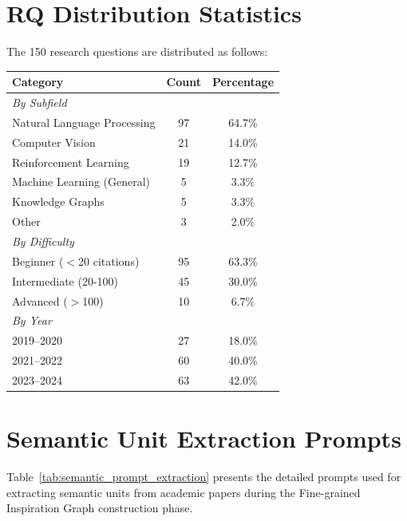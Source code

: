 \documentclass[runningheads]{llncs}
\begin{document}
\section{RQ Distribution Statistics}
\label{app:rq_distribution}

The 150 research questions are distributed as follows:

\begin{table}[h]
\centering
\small
\begin{tabular}{lcc}
\toprule
\textbf{Category} & \textbf{Count} & \textbf{Percentage} \\
\midrule
\multicolumn{3}{l}{\textit{By Subfield}} \\
Natural Language Processing & 97 & 64.7\% \\
Computer Vision & 21 & 14.0\% \\
Reinforcement Learning & 19 & 12.7\% \\
Machine Learning (General) & 5 & 3.3\% \\
Knowledge Graphs & 5 & 3.3\% \\
Other & 3 & 2.0\% \\
\midrule
\multicolumn{3}{l}{\textit{By Difficulty}} \\
Beginner ($<$20 citations) & 95 & 63.3\% \\
Intermediate (20-100) & 45 & 30.0\% \\
Advanced ($>$100) & 10 & 6.7\% \\
\midrule
\multicolumn{3}{l}{\textit{By Year}} \\
2019--2020 & 27 & 18.0\% \\
2021--2022 & 60 & 40.0\% \\
2023--2024 & 63 & 42.0\% \\
\bottomrule
\end{tabular}
\end{table}



\section{Semantic Unit Extraction Prompts}
\label{app:semantic_prompts}

Table~\ref{tab:semantic_prompt_extraction} presents the detailed prompts used for extracting semantic units from academic papers during the Fine-grained Inspiration Graph construction phase.
\end{document}
